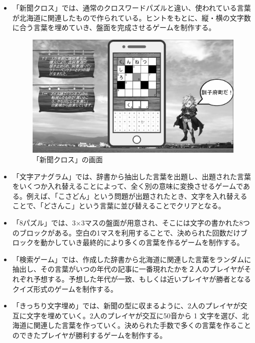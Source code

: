 \begin{itemize}
    \item 「新聞クロス」では、通常のクロスワードパズルと違い、使われている言葉が北海道に関連したもので作られている。ヒントをもとに、縦・横の文字数に合う言葉を埋めていき、盤面を完成させるゲームを制作する。
\begin{figure}[htbp]
    \centering
    \includegraphics[keepaspectratio, scale=0.2]{images/Project_picuture3.png}
    \caption{「新聞クロス」の画面}
\end{figure}
    \item 「文字アナグラム」では、辞書から抽出した言葉を出題し、出題された言葉をいくつか入れ替えることによって、全く別の意味に変換させるゲームである。例えば、「こさどん」という問題が出題されたとき、文字を入れ替えることで、「どさんこ」という言葉に並び替えることでクリアとなる。\\
    
    \item 「8パズル」では、3×3マスの盤面が用意され、そこには文字の書かれた8つのブロックがある。空白の1マスを利用することで、決められた回数だけブロックを動かしていき最終的により多くの言葉を作るゲームを制作する。\\
    
    \item 「検索ゲーム」では、作成した辞書から北海道に関連した言葉をランダムに抽出し、その言葉がいつの年代の記事に一番現れたかを２人のプレイヤがそれぞれ予想する。予想した年代が一致、もしくは近いプレイヤが勝者となるクイズ形式のゲームを制作する。\\
    
    \item 「きっちり文字埋め」では、新聞の型に収まるように、2人のプレイヤが交互に文字を埋めていく。2人のプレイヤが交互に50音から 1 文字を選び、北海道に関連した言葉を作っていく。決められた手数で多くの言葉を作ることのできたプレイヤが勝利するゲームを制作する。\\
    

\end{itemize}

